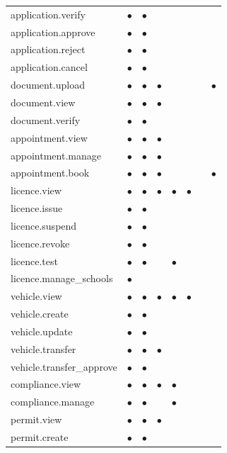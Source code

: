\begin{longtable}{@{}p{4.6cm}ccccccc@{}}
application.verify & $\bullet$ & $\bullet$ &  &  &  &  &  \\
application.approve & $\bullet$ & $\bullet$ &  &  &  &  &  \\
application.reject & $\bullet$ & $\bullet$ &  &  &  &  &  \\
application.cancel & $\bullet$ & $\bullet$ &  &  &  &  &  \\
document.upload & $\bullet$ & $\bullet$ & $\bullet$ &  &  &  & $\bullet$ \\
document.view & $\bullet$ & $\bullet$ & $\bullet$ &  &  &  &  \\
document.verify & $\bullet$ & $\bullet$ &  &  &  &  &  \\
appointment.view & $\bullet$ & $\bullet$ & $\bullet$ &  &  &  &  \\
appointment.manage & $\bullet$ & $\bullet$ & $\bullet$ &  &  &  &  \\
appointment.book & $\bullet$ & $\bullet$ & $\bullet$ &  &  &  & $\bullet$ \\
licence.view & $\bullet$ & $\bullet$ & $\bullet$ & $\bullet$ & $\bullet$ &  &  \\
licence.issue & $\bullet$ & $\bullet$ &  &  &  &  &  \\
licence.suspend & $\bullet$ & $\bullet$ &  &  &  &  &  \\
licence.revoke & $\bullet$ & $\bullet$ &  &  &  &  &  \\
licence.test & $\bullet$ & $\bullet$ &  & $\bullet$ &  &  &  \\
licence.manage\_\allowbreak{}schools & $\bullet$ &  &  &  &  &  &  \\
vehicle.view & $\bullet$ & $\bullet$ & $\bullet$ & $\bullet$ & $\bullet$ &  &  \\
vehicle.create & $\bullet$ & $\bullet$ &  &  &  &  &  \\
vehicle.update & $\bullet$ & $\bullet$ &  &  &  &  &  \\
vehicle.transfer & $\bullet$ & $\bullet$ & $\bullet$ &  &  &  &  \\
vehicle.transfer\_\allowbreak{}approve & $\bullet$ & $\bullet$ &  &  &  &  &  \\
compliance.view & $\bullet$ & $\bullet$ & $\bullet$ & $\bullet$ &  &  &  \\
compliance.manage & $\bullet$ & $\bullet$ &  & $\bullet$ &  &  &  \\
permit.view & $\bullet$ & $\bullet$ & $\bullet$ &  &  &  &  \\
permit.create & $\bullet$ & $\bullet$ &  &  &  &  &  \\

\end{longtable}
